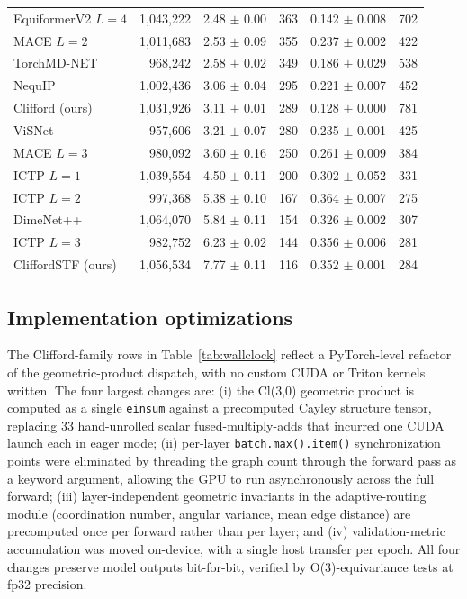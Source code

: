 \begin{table}[h]
\begin{tabular}{lrrrrr}
EquiformerV2 $L{=}4$ & 1{,}043{,}222 & 2.48 $\pm$ 0.00 &   363 & 0.142 $\pm$ 0.008 &   702 \\
MACE $L{=}2$       & 1{,}011{,}683 & 2.53 $\pm$ 0.09 &   355 & 0.237 $\pm$ 0.002 &   422 \\
TorchMD-NET        &   968{,}242 & 2.58 $\pm$ 0.02 &   349 & 0.186 $\pm$ 0.029 &   538 \\
NequIP             & 1{,}002{,}436 & 3.06 $\pm$ 0.04 &   295 & 0.221 $\pm$ 0.007 &   452 \\
Clifford (ours)    & 1{,}031{,}926 & 3.11 $\pm$ 0.01 &   289 & 0.128 $\pm$ 0.000 &   781 \\
ViSNet             &   957{,}606 & 3.21 $\pm$ 0.07 &   280 & 0.235 $\pm$ 0.001 &   425 \\
MACE $L{=}3$       &   980{,}092 & 3.60 $\pm$ 0.16 &   250 & 0.261 $\pm$ 0.009 &   384 \\
ICTP $L{=}1$       & 1{,}039{,}554 & 4.50 $\pm$ 0.11 &   200 & 0.302 $\pm$ 0.052 &   331 \\
ICTP $L{=}2$       &   997{,}368 & 5.38 $\pm$ 0.10 &   167 & 0.364 $\pm$ 0.007 &   275 \\
DimeNet++          & 1{,}064{,}070 & 5.84 $\pm$ 0.11 &   154 & 0.326 $\pm$ 0.002 &   307 \\
ICTP $L{=}3$       &   982{,}752 & 6.23 $\pm$ 0.02 &   144 & 0.356 $\pm$ 0.006 &   281 \\
CliffordSTF (ours) & 1{,}056{,}534 & 7.77 $\pm$ 0.11 &   116 & 0.352 $\pm$ 0.001 &   284 \\
\bottomrule
\end{tabular}
\end{table}

\subsection{Implementation optimizations}\label{supp:optim}

The Clifford-family rows in Table~\ref{tab:wallclock} reflect a PyTorch-level refactor of the geometric-product dispatch, with no custom CUDA or Triton kernels written. The four largest changes are: (i) the Cl(3,0) geometric product is computed as a single \texttt{einsum} against a precomputed Cayley structure tensor, replacing 33 hand-unrolled scalar fused-multiply-adds that incurred one CUDA launch each in eager mode; (ii) per-layer \texttt{batch.max().item()} synchronization points were eliminated by threading the graph count through the forward pass as a keyword argument, allowing the GPU to run asynchronously across the full forward; (iii) layer-independent geometric invariants in the adaptive-routing module (coordination number, angular variance, mean edge distance) are precomputed once per forward rather than per layer; and (iv) validation-metric accumulation was moved on-device, with a single host transfer per epoch. All four changes preserve model outputs bit-for-bit, verified by O(3)-equivariance tests at fp32 precision.

